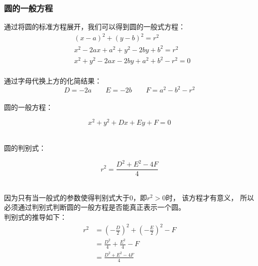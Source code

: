\documentclass[UTF8]{ctexart}
\begin{document}
\subsubsection{圆的一般方程}
    通过将圆的标准方程展开，我们可以得到圆的一般式方程：\vspace{5pt}
    \setcounter{equation}{0}
    \begin{align}
        &(x-a)^2+(y-b)^2=r^2\\[3mm]
        &x^2-2ax+a^2+y^2-2by+b^2=r^2\\[3mm]
        &x^2+y^2-2ax-2by+a^2+b^2-r^2=0
    \end{align}\\
    通过字母代换上方的化简结果：
    \begin{equation}
        D=-2a\qquad
        E=-2b\qquad
        F=a^2-b^2-r^2
    \end{equation}\\
    圆的一般方程：
    \begin{large}
        \begin{equation*}
            x^2+y^2+Dx+Ey+F=0
        \end{equation*}
    \end{large}\\
    圆的判别式：
    \begin{large}
        \begin{equation*}
            r^2=\frac{D^2+E^2-4F}{4}
        \end{equation*}
    \end{large}\\[2mm]
    因为只有当一般式的参数使得判别式大于$0$，即$r^2>0$时，
    该方程才有意义，
    所以必须通过判别式判断圆的一般方程是否能真正表示一个圆。\\[3mm]
    判别式的推导如下：
    \setcounter{equation}{0}
    \begin{align}
        r^2
        &=\left(-\frac{D}{2}\right)^2+\left(-\frac{E}{2}\right)^2-F\\[4mm]
        &=\frac{D^2}{4}+\frac{E^2}{4}-F\\[4mm]
        &=\frac{D^2+E^2-4F}{4}
    \end{align}
    
\newpage
\end{document}
